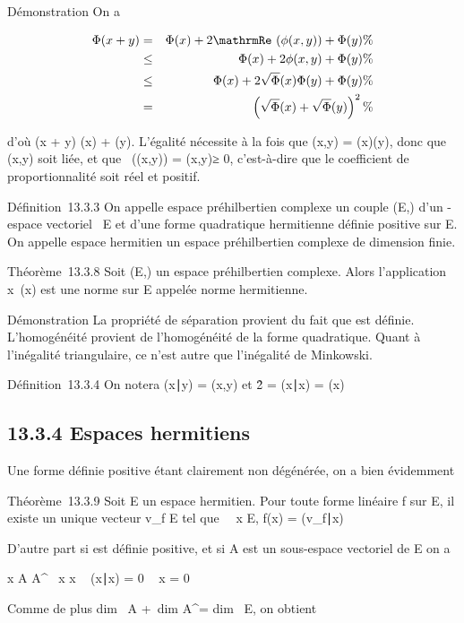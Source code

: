 \documentclass[]{article}
\begin{document}
Démonstration On a

\begin{align*} \Phi(x + y)& =& \Phi(x) +
2\mathrmRe~(\phi(x,y)) +
\Phi(y)\%& \\ & \leq& \Phi(x) +
2\phi(x,y) + \Phi(y) \%& \\
& \leq& \Phi(x) + 2\sqrt\Phi(x)\Phi(y) + \Phi(y)\%&
\\ & =& \left
(\sqrt\Phi(x) +
\sqrt\Phi(y)\right )^2 \%&
\\ \end{align*}

d'où \sqrt\Phi(x + y) \leq\sqrt\Phi(x) +
\sqrt\Phi(y). L'égalité nécessite à la fois que
\phi(x,y) = \sqrt\Phi(x)\Phi(y), donc que
(x,y) soit liée, et que
\mathrmRe~(\phi(x,y)) =
\phi(x,y)≥ 0, c'est-à-dire que le coefficient de
proportionnalité soit réel et positif.

Définition~13.3.3 On appelle espace préhilbertien complexe un couple
(E,\Phi) d'un -espace vectoriel ~E et d'une forme quadratique hermitienne
définie positive sur E. On appelle espace hermitien un espace
préhilbertien complexe de dimension finie.

Théorème~13.3.8 Soit (E,\Phi) un espace préhilbertien complexe. Alors
l'application x\mapsto~\sqrt\Phi(x)
est une norme sur E appelée norme hermitienne.

Démonstration La propriété de séparation provient du fait que \Phi est
définie. L'homogénéité provient de l'homogénéité de la forme
quadratique. Quant à l'inégalité triangulaire, ce n'est autre que
l'inégalité de Minkowski.

Définition~13.3.4 On notera (x∣y) = \phi(x,y) et
\x\^2 =
(x∣x) = \Phi(x)

\subsection{13.3.4 Espaces hermitiens}

Une forme définie positive étant clairement non dégénérée, on a bien
évidemment

Théorème~13.3.9 Soit E un espace hermitien. Pour toute forme linéaire f
sur E, il existe un unique vecteur v_f \in E tel que
\forall~~x \in E, f(x) =
(v_f∣x)

D'autre part si \Phi est définie positive, et si A est un sous-espace
vectoriel de E on a

x \in A \bigcap A^\bot\rigtharrow~ x \bot x \rigtharrow~ (x∣x) = 0 \rigtharrow~ x
= 0

Comme de plus dim~ A +\
dim A^\bot = dim~ E, on obtient
\end{document}
